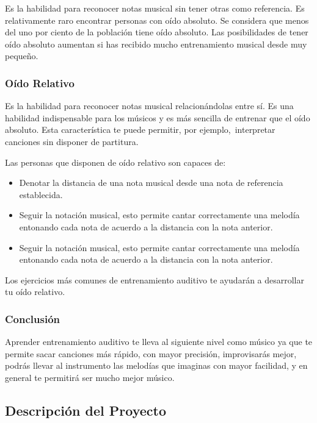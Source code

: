 \documentclass[12pt,twoside,titlepage]{report}
\begin{document}
Es la habilidad para reconocer notas musical sin tener otras como referencia. Es relativamente raro encontrar personas con oído absoluto. Se considera que menos del uno por ciento de la población tiene oído absoluto. Las posibilidades de tener oído absoluto aumentan si has recibido mucho entrenamiento musical desde muy pequeño.

\subsubsection{Oído Relativo}

Es la habilidad para reconocer notas musical relacionándolas entre sí. Es una habilidad indispensable para los músicos y es más sencilla de entrenar que el oído absoluto. Esta característica te puede permitir, por ejemplo, interpretar canciones sin disponer de partitura.

Las personas que disponen de oído relativo son capaces de:
\begin{itemize}
    \item Denotar la distancia de una nota musical desde una nota de referencia establecida.
    
    \item Seguir la notación musical, esto permite cantar correctamente una melodía entonando cada nota de acuerdo a la distancia con la nota anterior.
    
    \item Seguir la notación musical, esto permite cantar correctamente una melodía entonando cada nota de acuerdo a la distancia con la nota anterior.
\end{itemize}

Los ejercicios más comunes de entrenamiento auditivo te ayudarán a desarrollar tu oído relativo.

\subsubsection{Conclusión}

Aprender entrenamiento auditivo te lleva al siguiente nivel como músico ya que te permite sacar canciones más rápido, con mayor precisión, improvisarás mejor, podrás llevar al instrumento las melodías que imaginas con mayor facilidad, y en general te permitirá ser mucho mejor músico.

\subsection{Descripción del Proyecto}
\end{document}
